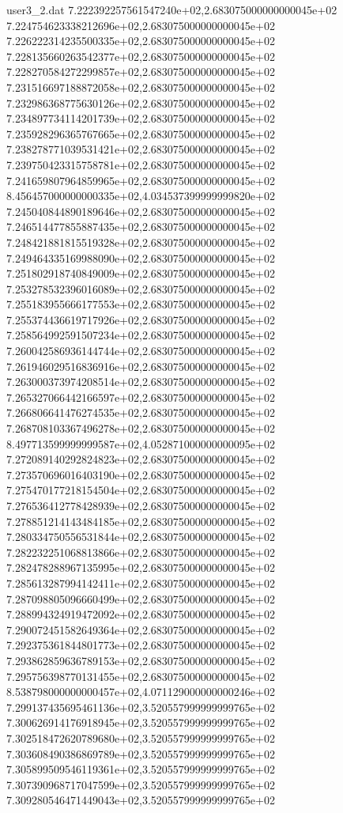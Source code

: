 \begin{filecontents}{user3_2.dat}
7.222392257561547240e+02,2.683075000000000045e+02
7.224754623338212696e+02,2.683075000000000045e+02
7.226222314235500335e+02,2.683075000000000045e+02
7.228135660263542377e+02,2.683075000000000045e+02
7.228270584272299857e+02,2.683075000000000045e+02
7.231516697188872058e+02,2.683075000000000045e+02
7.232986368775630126e+02,2.683075000000000045e+02
7.234897734114201739e+02,2.683075000000000045e+02
7.235928296365767665e+02,2.683075000000000045e+02
7.238278771039531421e+02,2.683075000000000045e+02
7.239750423315758781e+02,2.683075000000000045e+02
7.241659807964859965e+02,2.683075000000000045e+02
8.456457000000000335e+02,4.034537399999999820e+02
7.245040844890189646e+02,2.683075000000000045e+02
7.246514477855887435e+02,2.683075000000000045e+02
7.248421881815519328e+02,2.683075000000000045e+02
7.249464335169988090e+02,2.683075000000000045e+02
7.251802918740849009e+02,2.683075000000000045e+02
7.253278532396016089e+02,2.683075000000000045e+02
7.255183955666177553e+02,2.683075000000000045e+02
7.255374436619717926e+02,2.683075000000000045e+02
7.258564992591507234e+02,2.683075000000000045e+02
7.260042586936144744e+02,2.683075000000000045e+02
7.261946029516836916e+02,2.683075000000000045e+02
7.263000373974208514e+02,2.683075000000000045e+02
7.265327066442166597e+02,2.683075000000000045e+02
7.266806641476274535e+02,2.683075000000000045e+02
7.268708103367496278e+02,2.683075000000000045e+02
8.497713599999999587e+02,4.052871000000000095e+02
7.272089140292824823e+02,2.683075000000000045e+02
7.273570696016403190e+02,2.683075000000000045e+02
7.275470177218154504e+02,2.683075000000000045e+02
7.276536412778428939e+02,2.683075000000000045e+02
7.278851214143484185e+02,2.683075000000000045e+02
7.280334750556531844e+02,2.683075000000000045e+02
7.282232251068813866e+02,2.683075000000000045e+02
7.282478288967135995e+02,2.683075000000000045e+02
7.285613287994142411e+02,2.683075000000000045e+02
7.287098805096660499e+02,2.683075000000000045e+02
7.288994324919472092e+02,2.683075000000000045e+02
7.290072451582649364e+02,2.683075000000000045e+02
7.292375361844801773e+02,2.683075000000000045e+02
7.293862859636789153e+02,2.683075000000000045e+02
7.295756398770131455e+02,2.683075000000000045e+02
8.538798000000000457e+02,4.071129000000000246e+02
7.299137435695461136e+02,3.520557999999999765e+02
7.300626914176918945e+02,3.520557999999999765e+02
7.302518472620789680e+02,3.520557999999999765e+02
7.303608490386869789e+02,3.520557999999999765e+02
7.305899509546119361e+02,3.520557999999999765e+02
7.307390968717047599e+02,3.520557999999999765e+02
7.309280546471449043e+02,3.520557999999999765e+02

\end{filecontents}

